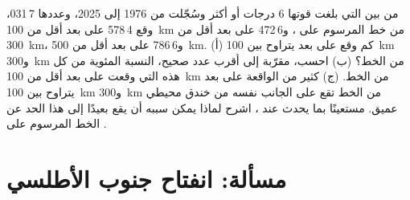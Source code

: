 \begin{exercise}[$\star\star\star$]\label{exo:g7:plate-tectonics:12}
من بين  التي بلغت قوتها 6 درجات أو أكثر وسُجّلت من 1976 إلى
2025، وعددها 7\,031، وقع 4\,578 على بعد أقل من \qty{100}{km} من خط  المرسوم على ، و6\,472 على بعد أقل من \qty{300}{km}، و6\,786 على بعد أقل
من \qty{500}{km}.
(أ) كم  وقع على بعد يتراوح بين \qty{100}{km} و\qty{300}{km} من
الخط؟ (ب) احسب، مقرّبة إلى أقرب عدد صحيح، النسبة المئوية من كل
هذه  التي وقعت على بعد أقل من \qty{100}{km} من الخط.
(ج) كثير من  الواقعة على بعد يتراوح بين \qty{100}{km} و\qty{300}{km} من
الخط تقع على الجانب نفسه من خندق محيطي عميق. مستعينًا بما يحدث
عند ، اشرح لماذا يمكن  سببه  أن يقع بعيدًا إلى هذا الحد عن الخط المرسوم على .
\end{exercise}

\section{مسألة: انفتاح جنوب الأطلسي}

